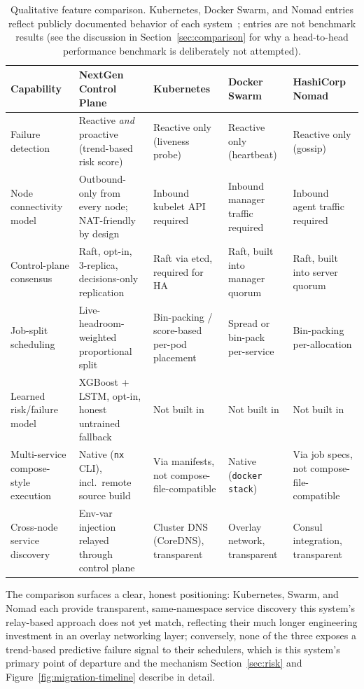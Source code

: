 \documentclass[conference]{IEEEtran}
\begin{document}
\begin{table}[t]
\caption{Qualitative feature comparison. Kubernetes, Docker Swarm, and Nomad entries reflect
publicly documented behavior of each system~\cite{burns2016borg,verma2015borg,hindman2011mesos}; entries
are not benchmark results (see the discussion in Section~\ref{sec:comparison} for why a head-to-head
performance benchmark is deliberately not attempted).}
\label{tab:comparison}
\centering
\scriptsize
\begin{tabularx}{\textwidth}{@{}p{} X X X X@{}}
\toprule
\textbf{Capability} & \textbf{NextGen Control Plane} & \textbf{Kubernetes} & \textbf{Docker Swarm} & \textbf{HashiCorp Nomad} \\
\midrule
Failure detection & Reactive \emph{and} proactive (trend-based risk score) & Reactive only (liveness probe) & Reactive only (heartbeat) & Reactive only (gossip) \\
Node connectivity model & Outbound-only from every node; NAT-friendly by design & Inbound kubelet API required & Inbound manager traffic required & Inbound agent traffic required \\
Control-plane consensus & Raft, opt-in, 3-replica, decisions-only replication & Raft via etcd, required for HA & Raft, built into manager quorum & Raft, built into server quorum \\
Job-split scheduling & Live-headroom-weighted proportional split & Bin-packing / score-based per-pod placement & Spread or bin-pack per-service & Bin-packing per-allocation \\
Learned risk/failure model & XGBoost + LSTM, opt-in, honest untrained fallback & Not built in & Not built in & Not built in \\
Multi-service compose-style execution & Native (\texttt{nx} CLI), incl.\ remote source build & Via manifests, not compose-file-compatible & Native (\texttt{docker stack}) & Via job specs, not compose-file-compatible \\
Cross-node service discovery & Env-var injection relayed through control plane & Cluster DNS (CoreDNS), transparent & Overlay network, transparent & Consul integration, transparent \\
\bottomrule
\end{tabularx}
\end{table}

The comparison surfaces a clear, honest positioning: Kubernetes, Swarm, and Nomad each provide
transparent, same-namespace service discovery this system's relay-based approach does not yet match,
reflecting their much longer engineering investment in an overlay networking layer; conversely, none
of the three exposes a trend-based predictive failure signal to their schedulers, which is this
system's primary point of departure and the mechanism Section~\ref{sec:risk} and
Figure~\ref{fig:migration-timeline} describe in detail.
\end{document}
